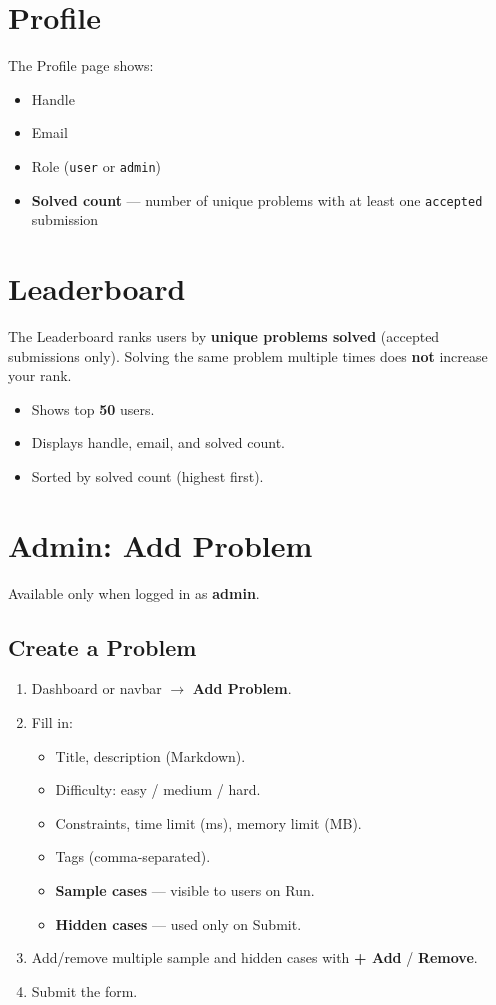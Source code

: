 \documentclass[11pt,a4paper]{article}
\begin{document}
\section{Profile}

The Profile page shows:
\begin{itemize}[noitemsep]
  \item Handle
  \item Email
  \item Role (\texttt{user} or \texttt{admin})
  \item \textbf{Solved count} --- number of unique problems with at least one \texttt{accepted} submission
\end{itemize}

\section{Leaderboard}

The Leaderboard ranks users by \textbf{unique problems solved} (accepted submissions only). Solving the same problem multiple times does \textbf{not} increase your rank.

\begin{itemize}[noitemsep]
  \item Shows top \textbf{50} users.
  \item Displays handle, email, and solved count.
  \item Sorted by solved count (highest first).
\end{itemize}

\section{Admin: Add Problem}

Available only when logged in as \textbf{admin}.

\subsection{Create a Problem}
\begin{enumerate}
  \item Dashboard or navbar $\rightarrow$ \textbf{Add Problem}.
  \item Fill in:
  \begin{itemize}[noitemsep]
    \item Title, description (Markdown).
    \item Difficulty: easy / medium / hard.
    \item Constraints, time limit (ms), memory limit (MB).
    \item Tags (comma-separated).
    \item \textbf{Sample cases} --- visible to users on Run.
    \item \textbf{Hidden cases} --- used only on Submit.
  \end{itemize}
  \item Add/remove multiple sample and hidden cases with \textbf{+ Add} / \textbf{Remove}.
  \item Submit the form.
\end{enumerate}
\end{document}

